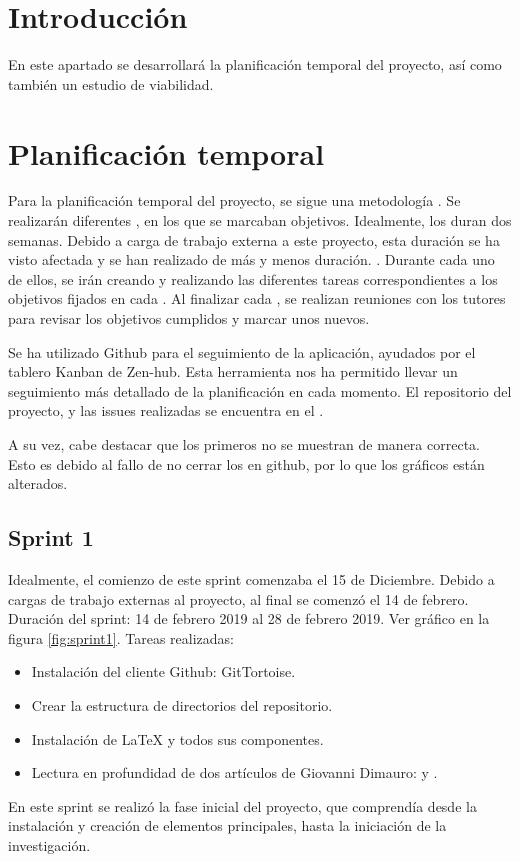 
\section{Introducción}
En este apartado se desarrollará la planificación temporal del proyecto, así como también un estudio de viabilidad.

\section{Planificación temporal}
Para la planificación temporal del proyecto, se sigue una metodología . Se realizarán diferentes , en los que se marcaban objetivos. Idealmente, los  duran dos semanas. Debido a carga de trabajo externa a este proyecto, esta duración se ha visto afectada y se han realizado  de más y menos duración. . Durante cada uno de ellos, se irán creando y realizando las diferentes tareas correspondientes a los objetivos fijados en cada . Al finalizar cada , se realizan reuniones con los tutores para revisar los objetivos cumplidos y marcar unos nuevos. 

Se ha utilizado Github para el seguimiento de la aplicación, ayudados por el tablero Kanban de Zen-hub. Esta herramienta nos ha permitido llevar un seguimiento más detallado de la planificación en cada momento. El repositorio del proyecto, y las issues realizadas se encuentra en el .

A su vez, cabe destacar que los primeros  no se muestran de manera correcta. Esto es debido al fallo de no cerrar los  en github, por lo que los gráficos  están alterados.

\subsection{Sprint 1}
Idealmente, el comienzo de este sprint comenzaba el 15 de Diciembre. Debido a cargas de trabajo externas al proyecto, al final se comenzó el 14 de febrero. Duración del sprint: 14 de febrero 2019 al 28 de febrero 2019. Ver gráfico  en la figura \ref{fig:sprint1}.
Tareas realizadas:
\begin{itemize}
\item Instalación del cliente Github: GitTortoise.
\item Crear la estructura de directorios del repositorio.
\item Instalación de \LaTeX{} y todos sus componentes. 
\item Lectura en profundidad de dos artículos de Giovanni Dimauro: \cite{giovanni1} y \cite{giovanni2} . 
\end{itemize}
En este sprint se realizó la fase inicial del proyecto, que comprendía desde la instalación y creación de elementos principales, hasta la iniciación de la investigación.


